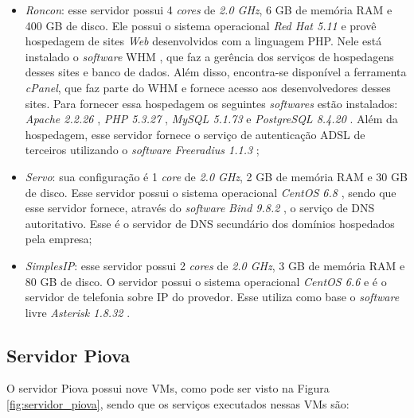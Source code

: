 \begin{itemize}
 \item \textit{Roncon}: esse servidor possui 4 \textit{cores} de \textit{2.0 GHz}, 6 GB de memória \ac{RAM} e 400 GB de disco. 
 Ele possui o sistema operacional \textit{Red Hat 5.11} \cite{redhat} e provê hospedagem de sites \textit{Web} desenvolvidos com a linguagem 
 \ac{PHP}. Nele está instalado o \textit{software} \ac{WHM} \cite{whm}, que faz a gerência dos serviços de hospedagens desses sites e banco de 
 dados. Além disso, encontra-se disponível a ferramenta \textit{cPanel}, que faz parte do \ac{WHM} e fornece acesso aos desenvolvedores desses
 sites. Para fornecer essa hospedagem os seguintes \textit{softwares} estão instalados: \textit{Apache 2.2.26} \cite{apache}, 
 \textit{\ac{PHP} 5.3.27} \cite{php}, \textit{MySQL 5.1.73} \cite{mysql} e \textit{PostgreSQL 8.4.20} \cite{postgres}.
 Além da hospedagem, esse servidor fornece o serviço de autenticação \ac{ADSL} \cite{tanenbaum2011} de terceiros utilizando o \textit{software} 
 \textit{Freeradius 1.1.3} \cite{freeradius};
 
 \item \textit{Servo}: sua configuração é 1 \textit{core} de \textit{2.0 GHz}, 2 GB de memória \ac{RAM} e 30 GB de disco. 
 Esse servidor possui o sistema operacional \textit{CentOS 6.8} \cite{centos}, sendo que esse servidor fornece, através do \textit{software} 
 \textit{Bind 9.8.2} \cite{bind}, o serviço de \ac{DNS} autoritativo. Esse é o servidor de \ac{DNS} secundário dos domínios hospedados pela empresa;
 
 \item \textit{SimplesIP}: esse servidor possui 2 \textit{cores} de \textit{2.0 GHz}, 3 GB de memória \ac{RAM} e 80 GB de disco. 
 O servidor possui o sistema operacional \textit{CentOS 6.6} \cite{centos} e é o servidor de telefonia sobre \ac{IP} do provedor. Esse utiliza 
 como base o \textit{software} livre \textit{Asterisk 1.8.32} \cite{asterisk}.
\end{itemize}

\subsection{Servidor Piova}
\label{section:serv_piova}

O servidor Piova possui nove \ac{VM}s, como pode ser visto na Figura \ref{fig:servidor_piova}, sendo que os serviços executados nessas \ac{VM}s
são:

